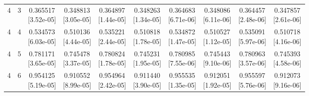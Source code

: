 \documentclass[12pt,letterpaper]{article}
\theoremstyle{plain}
\theoremstyle{definition}
\begin{document}
\begin{table}[p]
\begin{adjustbox}{max width=\linewidth}
\begin{tabular}{@{}rr*{8}{c}@{}}
4 & 3 & \shortstack{0.365517\\[-1pt]{\scriptsize[3.52e-05]}} & \shortstack{0.348813\\[-1pt]{\scriptsize[3.05e-05]}} & \shortstack{0.364897\\[-1pt]{\scriptsize[1.44e-05]}} & \shortstack{0.348263\\[-1pt]{\scriptsize[1.34e-05]}} & \shortstack{0.364683\\[-1pt]{\scriptsize[6.71e-06]}} & \shortstack{0.348086\\[-1pt]{\scriptsize[6.11e-06]}} & \shortstack{0.364457\\[-1pt]{\scriptsize[2.48e-06]}} & \shortstack{0.347857\\[-1pt]{\scriptsize[2.61e-06]}}\\
4 & 4 & \shortstack{0.534573\\[-1pt]{\scriptsize[6.03e-05]}} & \shortstack{0.510136\\[-1pt]{\scriptsize[4.44e-05]}} & \shortstack{0.535221\\[-1pt]{\scriptsize[2.44e-05]}} & \shortstack{0.510818\\[-1pt]{\scriptsize[1.78e-05]}} & \shortstack{0.534872\\[-1pt]{\scriptsize[1.47e-05]}} & \shortstack{0.510527\\[-1pt]{\scriptsize[1.12e-05]}} & \shortstack{0.535091\\[-1pt]{\scriptsize[5.97e-06]}} & \shortstack{0.510718\\[-1pt]{\scriptsize[4.16e-06]}}\\
4 & 5 & \shortstack{0.781171\\[-1pt]{\scriptsize[3.65e-05]}} & \shortstack{0.745478\\[-1pt]{\scriptsize[3.37e-05]}} & \shortstack{0.780824\\[-1pt]{\scriptsize[1.78e-05]}} & \shortstack{0.745231\\[-1pt]{\scriptsize[1.95e-05]}} & \shortstack{0.780985\\[-1pt]{\scriptsize[7.55e-06]}} & \shortstack{0.745443\\[-1pt]{\scriptsize[9.10e-06]}} & \shortstack{0.780963\\[-1pt]{\scriptsize[3.57e-06]}} & \shortstack{0.745393\\[-1pt]{\scriptsize[4.58e-06]}}\\
4 & 6 & \shortstack{0.954125\\[-1pt]{\scriptsize[5.19e-05]}} & \shortstack{0.910552\\[-1pt]{\scriptsize[8.99e-05]}} & \shortstack{0.954964\\[-1pt]{\scriptsize[2.42e-05]}} & \shortstack{0.911440\\[-1pt]{\scriptsize[3.90e-05]}} & \shortstack{0.955535\\[-1pt]{\scriptsize[1.35e-05]}} & \shortstack{0.912051\\[-1pt]{\scriptsize[1.92e-05]}} & \shortstack{0.955597\\[-1pt]{\scriptsize[5.76e-06]}} & \shortstack{0.912073\\[-1pt]{\scriptsize[9.16e-06]}}\\

\end{tabular}
\end{adjustbox}
\end{table}
\end{document}
